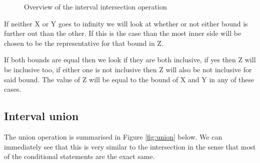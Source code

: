 \documentclass[12pt]{thesis}
\begin{document}
\begin{figure}
	\caption{Overview of the interval intersection operation}
	\label{fig:intersection}
\end{figure}

If neither X or Y goes to infinity we will look at whether or not either bound is further out than the other. If this is the case than the most inner side will be chosen to be the representative for that bound in Z. 

If both bounds are equal then we look if they are both inclusive, if yes then Z will be inclusive too, if either one is not inclusive then Z will also be not inclusive for said bound. The value of Z will be equal to the bound of X and Y in any of these cases.

\subsection{Interval union}
The union operation is summarised in Figure \ref{fig:union} below. We can immediately see that this is very similar to the intersection in the sense that most of the conditional statements are the exact same. 
\end{document}
